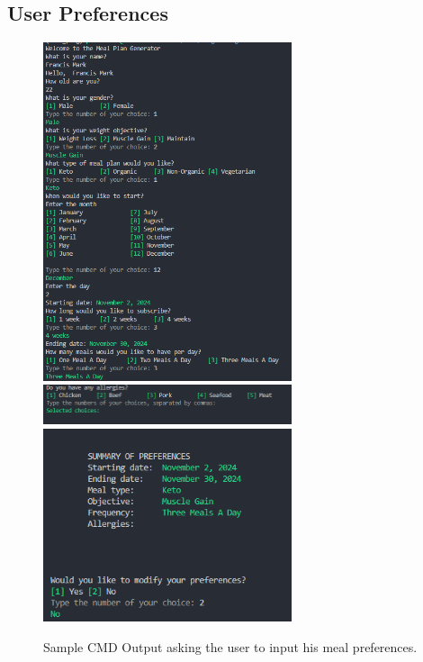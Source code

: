 \documentclass{article}
\begin{document}
\subsection{User Preferences}
\begin{figure}[!hbt]
  \begin{center}
    \includegraphics[width=0.65\textwidth]{docs/image.png}
    \includegraphics[width=0.65\textwidth]{docs/image-1.png}
    \includegraphics[width=0.65\textwidth]{docs/image-2.png}
    \caption{Sample CMD Output asking the user to input his meal preferences.}
  \end{center}
\end{figure}
\end{document}
